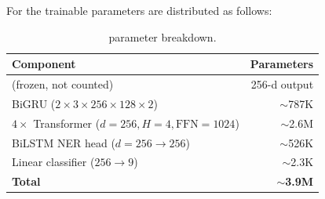 For \LightRet{} the trainable parameters are distributed as follows:

\begin{table}[h]
\centering
\caption{\LightRet{} parameter breakdown.}
\label{tab:params}
\begin{tabular}{lr}
\toprule
\textbf{Component} & \textbf{Parameters} \\
\midrule
\RetVec{} (frozen, not counted) & 256-d output \\
BiGRU ($2 \times 3 \times 256 \times 128 \times 2$) & $\sim$787K \\
$4\times$ Transformer ($d{=}256, H{=}4, \text{FFN}{=}1024$) & $\sim$2.6M \\
BiLSTM NER head ($d{=}256{\to}256$) & $\sim$526K \\
Linear classifier ($256{\to}9$) & $\sim$2.3K \\
\midrule
\textbf{Total} & $\bm{\sim}$\textbf{3.9M} \\
\bottomrule
\end{tabular}
\end{table}
